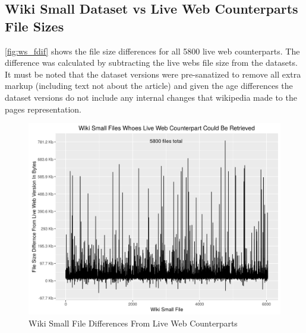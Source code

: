 \documentclass[11pt]{article}
\begin{document}
\subsection*{Wiki Small Dataset vs Live Web Counterparts File Sizes} 
\autoref{fig:ws_fdif} shows the file size differences for all 5800 live web counterparts. The difference was calculated by subtracting the live webs file size from the datasets. It must be noted that the dataset versions were pre-sanatized to remove all extra markup (including text not about the article) and given the age differences the dataset versions do not include any internal changes that wikipedia made to the pages representation.
\begin{figure}[H]
\centering
\includegraphics[scale=0.8]{wikismall_dif.png}
\caption{Wiki Small File Differences From Live Web Counterparts}
\label{fig:ws_fdif}
\end{figure}
\end{document}
